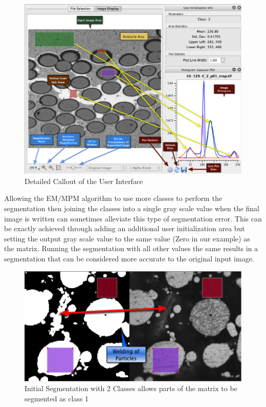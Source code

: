 \documentclass[12pt,oneside]{book}
\begin{document}
\begin{figure}[htbp]
\begin{center}
\includegraphics[width=6.25in]{images/Untitled10.png}
\caption{Detailed Callout of the User Interface}
\label{image10}
\end{center}
\end{figure}

Allowing the EM/MPM algorithm to use more classes to perform the segmentation then joining the classes into a single gray scale value when the final image is written can sometimes alleviate this type of segmentation error. This can be exactly achieved through adding an additional user initialization area but setting the output gray scale value to the same value (Zero in our example) as the matrix. Running the segmentation with all other values the same results in a segmentation that can be considered more accurate to the original input image.
 
\begin{figure}[htbp]
\begin{center}
\includegraphics[width=6.25in]{images/Untitled11.png}
\caption{Initial Segmentation with 2 Classes allows parts of the matrix to be segmented as class 1}
\label{image11}
\end{center}
\end{figure}
\end{document}
